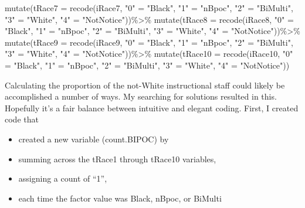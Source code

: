 \documentclass[
  english,
]{book}
\newenvironment{Shaded}{\begin{snugshade}}{\end{snugshade}}
\newcommand{\AttributeTok}[1]{\textcolor[rgb]{0.77,0.63,0.00}{#1}}
\newcommand{\FunctionTok}[1]{\textcolor[rgb]{0.00,0.00,0.00}{#1}}
\newcommand{\NormalTok}[1]{#1}
\newcommand{\OtherTok}[1]{\textcolor[rgb]{0.56,0.35,0.01}{#1}}
\newcommand{\SpecialCharTok}[1]{\textcolor[rgb]{0.00,0.00,0.00}{#1}}
\newcommand{\StringTok}[1]{\textcolor[rgb]{0.31,0.60,0.02}{#1}}
\providecommand{\tightlist}{%
  \setlength{\itemsep}{0pt}\setlength{\parskip}{0pt}}
\begin{document}
\begin{Shaded}
\begin{Highlighting}[]
  \FunctionTok{mutate}\NormalTok{(}\AttributeTok{tRace7 =} \FunctionTok{recode}\NormalTok{(iRace7, }\StringTok{"0"} \OtherTok{=} \StringTok{"Black"}\NormalTok{, }\StringTok{"1"} \OtherTok{=} \StringTok{"nBpoc"}\NormalTok{, }\StringTok{"2"} \OtherTok{=} \StringTok{"BiMulti"}\NormalTok{, }\StringTok{"3"} \OtherTok{=} \StringTok{"White"}\NormalTok{, }\StringTok{"4"} \OtherTok{=} \StringTok{"NotNotice"}\NormalTok{))}\SpecialCharTok{\%\textgreater{}\%}
  \FunctionTok{mutate}\NormalTok{(}\AttributeTok{tRace8 =} \FunctionTok{recode}\NormalTok{(iRace8, }\StringTok{"0"} \OtherTok{=} \StringTok{"Black"}\NormalTok{, }\StringTok{"1"} \OtherTok{=} \StringTok{"nBpoc"}\NormalTok{, }\StringTok{"2"} \OtherTok{=} \StringTok{"BiMulti"}\NormalTok{, }\StringTok{"3"} \OtherTok{=} \StringTok{"White"}\NormalTok{, }\StringTok{"4"} \OtherTok{=} \StringTok{"NotNotice"}\NormalTok{))}\SpecialCharTok{\%\textgreater{}\%}
  \FunctionTok{mutate}\NormalTok{(}\AttributeTok{tRace9 =} \FunctionTok{recode}\NormalTok{(iRace9, }\StringTok{"0"} \OtherTok{=} \StringTok{"Black"}\NormalTok{, }\StringTok{"1"} \OtherTok{=} \StringTok{"nBpoc"}\NormalTok{, }\StringTok{"2"} \OtherTok{=} \StringTok{"BiMulti"}\NormalTok{, }\StringTok{"3"} \OtherTok{=} \StringTok{"White"}\NormalTok{, }\StringTok{"4"} \OtherTok{=} \StringTok{"NotNotice"}\NormalTok{))}\SpecialCharTok{\%\textgreater{}\%}
  \FunctionTok{mutate}\NormalTok{(}\AttributeTok{tRace10 =} \FunctionTok{recode}\NormalTok{(iRace10, }\StringTok{"0"} \OtherTok{=} \StringTok{"Black"}\NormalTok{, }\StringTok{"1"} \OtherTok{=} \StringTok{"nBpoc"}\NormalTok{, }\StringTok{"2"} \OtherTok{=} \StringTok{"BiMulti"}\NormalTok{, }\StringTok{"3"} \OtherTok{=} \StringTok{"White"}\NormalTok{, }\StringTok{"4"} \OtherTok{=} \StringTok{"NotNotice"}\NormalTok{))}
\end{Highlighting}
\end{Shaded}

Calculating the proportion of the not-White instructional staff could likely be accomplished a number of ways. My searching for solutions resulted in this. Hopefully it's a fair balance between intuitive and elegant coding. First, I created code that

\begin{itemize}
\tightlist
\item
  created a new variable (count.BIPOC) by
\item
  summing across the tRace1 through tRace10 variables,
\item
  assigning a count of ``1'',
\item
  each time the factor value was Black, nBpoc, or BiMulti
\end{itemize}
\end{document}
